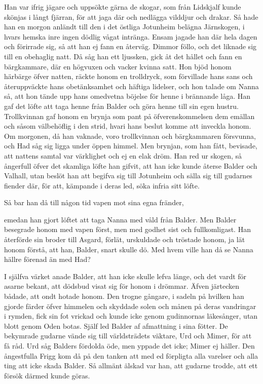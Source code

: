Han var ifrig jägare och uppsökte gärna de skogar, som från Lidskjalf
kunde skönjas i långt fjärran, för att jaga där och nedlägga vilddjur
och drakar. Så hade han en morgon anländt till den i det östliga
Jotunheim belägna Järnskogen, i hvars hemska inre ingen dödlig vågat
intränga. Ensam jagade han där hela dagen och förirrade sig, så att han
ej fann en återväg. Dimmor föllo, och det liknade sig till en obehaglig
natt. Då såg han ett ljussken, gick åt det hållet och fann en
bärgkammare, där en högvuxen och vacker kvinna satt. Hon bjöd honom
härbärge öfver natten, räckte honom en trolldryck, som förvillade hans
sans och återuppväckte hans obetänksamhet och häftiga lidelser, och hon
talade om Nanna så, att hon tände upp hans omedvetna böjelse för henne i
brännande låga. Han gaf det löfte att taga henne från Balder och göra
henne till sin egen hustru. Trollkvinnan gaf honom en brynja som pant på
öfverenskommelsen dem emällan och såsom välbehöflig i den strid, hvari
hans beslut komme att inveckla honom. Om morgonen, då han vaknade, voro
trollkvinnan och bärgkammaren försvunna, och Had såg sig ligga under
öppen himmel. Men brynjan, som han fått, bevisade, att nattens samtal
var värklighet och ej en elak dröm. Han red ur skogen, så ångerfull
öfver det skamliga löfte han gifvit, att han icke kunde återse Balder
och Valhall, utan beslöt han att begifva sig till Jotunheim och sälla
sig till gudarnes fiender där, för att, kämpande i deras led, söka
infria sitt löfte.

Så bar han då till någon tid vapen mot sina egna fränder,

emedan han gjort löftet att taga Nanna med våld från Balder. Men Balder
besegrade honom med vapen först, men med godhet sist och fullkomligast.
Han återförde sin broder till Asgard, förlät, urskuldade och tröstade
honom, ja lät honom förstå, att han, Balder, snart skulle dö. Med hvem
ville han då se Nanna hällre förenad än med Had?

I själfva värket anade Balder, att han icke skulle lefva länge, och det
vardt för asarne bekant, att dödsbud visat sig för honom i drömmar.
Äfven järtecken bådade, att ondt hotade honom. Den trogne gångare, i
sadeln på hvilken han gjorde färder öfver himmelen och skyddade solen
och månen på deras vandringar i rymden, fick sin fot vrickad och kunde
icke genom gudinnornas läkesånger, utan blott genom Oden botas. Själf
led Balder af afmattning i sina fötter. De bekymrade gudarne vände sig
till världsträdets väktare, Urd och Mimer, för att få råd. Urd såg
Balders fördolda öde, men yppade det icke; Mimer ej häller. Den
ångestfulla Frigg kom då på den tanken att med ed förpligta alla
varelser och alla ting att icke skada Balder. Så allmänt älskad var han,
att gudarne trodde, att ett försök därmed kunde göras.


